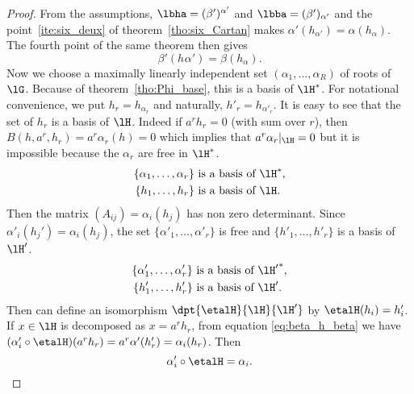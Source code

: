 \begin{proof}
From the assumptions, $\lbha=(\beta')^{\alpha'}$ and $\lbba=(\beta')_{\alpha'}$ and the point~\ref{ite:six_deux} of theorem~\ref{tho:six_Cartan} makes $\alpha'(h_{\alpha'})=\alpha(h_{\alpha})$. The fourth point of the same theorem then gives
\begin{equation}\label{eq:beta_h_beta}
\beta'(h_{}\alpha')=\beta(h_{\alpha}).
\end{equation}
Now we choose a maximally linearly independent set $(\alpha_1,\ldots,\alpha_R)$ of roots of $\lG$. Because of theorem~\ref{tho:Phi_base}, this is a basis of $\lH^*$. For notational convenience, we put $h_r=h_{\alpha_r}$ and naturally, $h'_r=h_{\alpha'_r}$. It is easy to see that the set of $h_r$ is a basis of $\lH$. Indeed if $a^rh_r=0$ (with sum over $r$), then $B(h,a^r,h_r)=a^r\alpha_r(h)=0$ which implies that $a^r\alpha_r|_{\lH}=0$ but it is impossible because the $\alpha_r$ are free in $\lH^*$.
\begin{equation*}
\begin{split}
\{ \alpha_1,\ldots,\alpha_r \}&\textrm{ is a basis of $\lH^*$},\\
\{ h_1,\ldots,h_r \}&\textrm{ is a basis of $\lH$}.
\end{split}
\end{equation*}
Then the matrix $(A_{ij})=\alpha_i(h_j)$ has non zero determinant. Since $\alpha'_i(h_j')=\alpha_i(h_j)$, the set $\{\alpha'_1,\ldots,\alpha'_r\}$ is free and $\{h'_1,\ldots,h'_r\}$ is a basis of $\lH'$.
\begin{equation*}
\begin{split}
\{ \alpha'_1,\ldots,\alpha'_r \}&\textrm{ is a basis of ${\lH'}^*$},\\
\{ h'_1,\ldots,h'_r \}&\textrm{ is a basis of $\lH'$}.
\end{split}
\end{equation*}
Then can define an isomorphism $\dpt{\etalH}{\lH}{\lH'}$ by $\etalH(h_i)=h'_i$. If $x\in\lH$ is decomposed as $x=a^rh_r$, from equation \eqref{eq:beta_h_beta} we have $(\alpha'_i\circ\etalH)(a^rh_r)=a^r\alpha'(h'_r)=\alpha_i(h_r)$. Then
\[
\alpha'_i\circ\etalH=\alpha_i.
\]


\end{proof}
